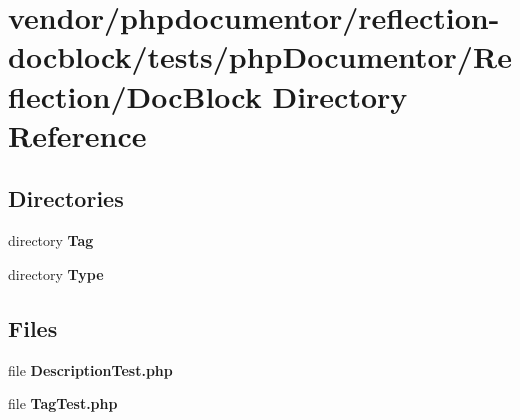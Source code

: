 \section{vendor/phpdocumentor/reflection-\/docblock/tests/php\+Documentor/\+Reflection/\+Doc\+Block Directory Reference}
\label{dir_d7c25d23570db5e7fd23bfbccb8efeb0}
\subsection*{Directories}
\begin{DoxyCompactItemize}
\item 
directory {\bf Tag}
\item 
directory {\bf Type}
\end{DoxyCompactItemize}
\subsection*{Files}
\begin{DoxyCompactItemize}
\item 
file {\bf Description\+Test.\+php}
\item 
file {\bf Tag\+Test.\+php}
\end{DoxyCompactItemize}
